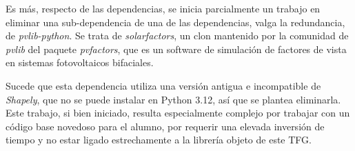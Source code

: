 Es más, respecto de las dependencias, se inicia parcialmente un trabajo en eliminar una sub-dependencia de una de las dependencias, valga la redundancia, de \textit{pvlib-python}. Se trata de \textit{solarfactors}, un clon mantenido por la comunidad de \textit{pvlib} del paquete \textit{pvfactors}, que es un software de simulación de factores de vista en sistemas fotovoltaicos bifaciales.

Sucede que esta dependencia utiliza una versión antigua e incompatible de \textit{Shapely}, que no se puede instalar en Python 3.12, así que se plantea eliminarla. Este trabajo, si bien iniciado, resulta especialmente complejo por trabajar con un código base novedoso para el alumno, por requerir una elevada inversión de tiempo y no estar ligado estrechamente a la librería objeto de este TFG.
